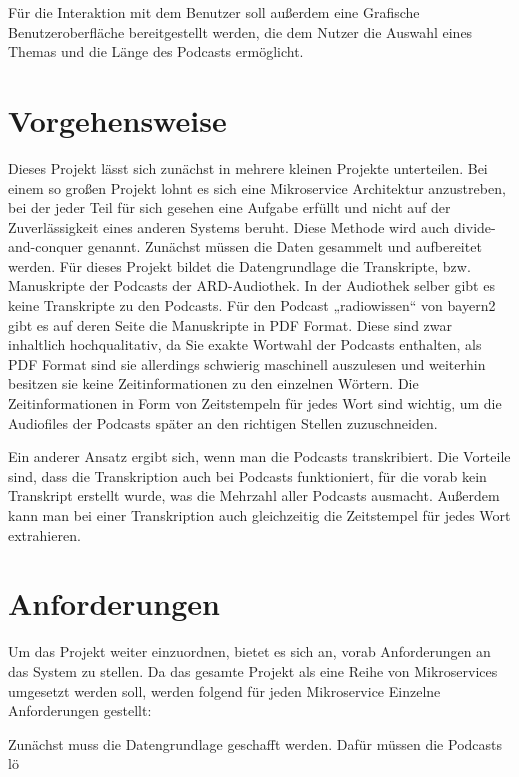 Für die Interaktion mit dem Benutzer soll außerdem eine Grafische Benutzeroberfläche bereitgestellt werden, die dem Nutzer die Auswahl eines Themas und die Länge des Podcasts ermöglicht.



\section{Vorgehensweise}

Dieses Projekt lässt sich zunächst in mehrere kleinen Projekte unterteilen. 
Bei einem so großen Projekt lohnt es sich eine Mikroservice Architektur anzustreben, bei der jeder Teil für sich gesehen eine Aufgabe erfüllt und nicht auf der Zuverlässigkeit eines anderen Systems beruht. 
Diese Methode wird auch divide-and-conquer genannt. 
Zunächst müssen die Daten gesammelt und aufbereitet werden. 
Für dieses Projekt bildet die Datengrundlage die Transkripte, bzw. Manuskripte der Podcasts der ARD-Audiothek. 
In der Audiothek selber gibt es keine Transkripte zu den Podcasts. 
Für den Podcast „radiowissen“ von bayern2 gibt es auf deren Seite die Manuskripte in PDF Format. 
Diese sind zwar inhaltlich hochqualitativ, da Sie exakte Wortwahl der Podcasts enthalten, als PDF Format sind sie allerdings schwierig maschinell auszulesen und weiterhin besitzen sie keine Zeitinformationen zu den einzelnen Wörtern. 
Die Zeitinformationen in Form von Zeitstempeln für jedes Wort sind wichtig, um die Audiofiles der Podcasts später an den richtigen Stellen zuzuschneiden. 

Ein anderer Ansatz ergibt sich, wenn man die Podcasts transkribiert. 
Die Vorteile sind, dass die Transkription auch bei Podcasts funktioniert, für die vorab kein Transkript erstellt wurde, was die Mehrzahl aller Podcasts ausmacht. 
Außerdem kann man bei einer Transkription auch gleichzeitig die Zeitstempel für jedes Wort extrahieren.


\section{Anforderungen}

Um das Projekt weiter einzuordnen, bietet es sich an, vorab Anforderungen an das System zu stellen. 
Da das gesamte Projekt als eine Reihe von Mikroservices umgesetzt werden soll, werden folgend für jeden Mikroservice Einzelne Anforderungen gestellt: 

Zunächst muss die Datengrundlage geschafft werden. Dafür müssen die Podcasts lö

